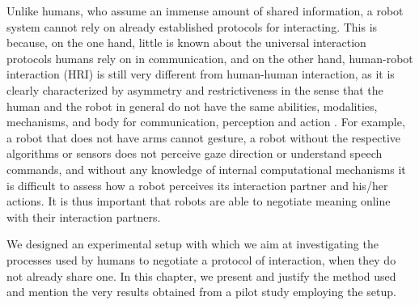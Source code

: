 Unlike humans, who assume an immense amount of shared information, a robot system cannot rely on already established protocols for interacting. This is because, on the one hand, little is known about the universal interaction protocols humans rely on in communication, and on the other hand, human-robot interaction (HRI) is still very different from human-human interaction, as it is clearly characterized by asymmetry and restrictiveness in the sense that the human and the robot in general do not have the same abilities, modalities, mechanisms, and body for communication, perception and action \cite{lohse2010investigating}. For example, a robot that does not have arms cannot gesture, a robot without the respective algorithms or sensors does not perceive gaze direction or understand speech commands, and without any knowledge of internal computational mechanisms it is difficult to assess how a robot perceives its interaction partner and his/her actions. It is thus important that robots are able to negotiate meaning online with their interaction partners.

We designed an experimental setup with which we aim at investigating the processes used by humans to negotiate a protocol of interaction, when they do not already share one. In this chapter, we present and justify the method used and mention the very results obtained from a pilot study employing the setup.

